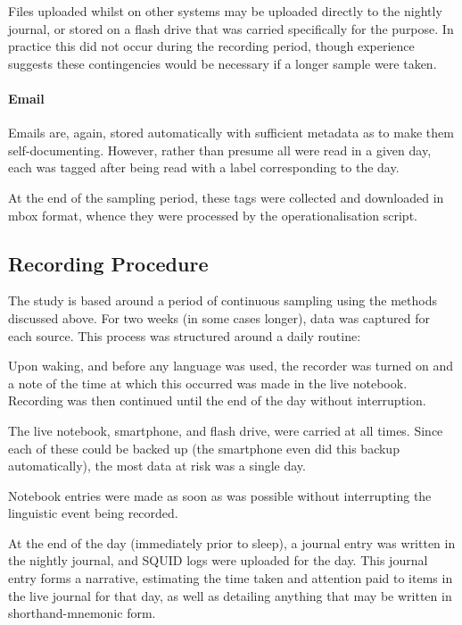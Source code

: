 Files uploaded whilst on other systems may be uploaded directly to the nightly journal, or stored on a flash drive that was carried specifically for the purpose.  In practice this did not occur during the recording period, though experience suggests these contingencies would be necessary if a longer sample were taken.

\paragraph{Email}
Emails are, again, stored automatically with sufficient metadata as to make them self-documenting.  However, rather than presume all were read in a given day, each was tagged after being read with a label corresponding to the day.

At the end of the sampling period, these tags were collected and downloaded in mbox format, whence they were processed by the operationalisation script.









\subsection{Recording Procedure}
\label{sec:personal:method:recording}
The study is based around a period of continuous sampling using the methods discussed above.  For two weeks (in some cases longer), data was captured for each source.  This process was structured around a daily routine:

Upon waking, and before any language was used, the recorder was turned on and a note of the time at which this occurred was made in the live notebook.  Recording was then continued until the end of the day without interruption.

The live notebook, smartphone, and flash drive, were carried at all times.  Since each of these could be backed up (the smartphone even did this backup automatically), the most data at risk was a single day.

Notebook entries were made as soon as was possible without interrupting the linguistic event being recorded.

At the end of the day (immediately prior to sleep), a journal entry was written in the nightly journal, and SQUID logs were uploaded for the day.  This journal entry forms a narrative, estimating the time taken and attention paid to items in the live journal for that day, as well as detailing anything that may be written in shorthand-mnemonic form.










